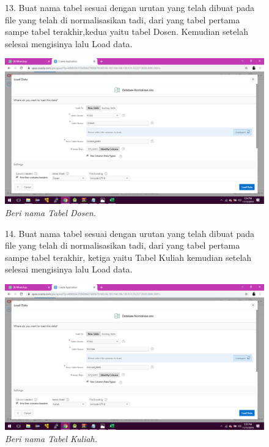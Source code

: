 \begin{enumerate}
\begin{figure}
\item[13.]Buat nama tabel sesuai dengan urutan yang telah dibuat pada file yang telah di normalisasikan tadi, dari yang tabel pertama sampe tabel terakhir,kedua yaitu tabel Dosen. Kemudian setelah selesai mengisinya lalu Load data.
    \begin{center}
    \includegraphics[scale=0.3]{figures/10.png}
    \caption{\textit{Beri nama Tabel Dosen.}}
    \end{center}
    \label{gambar}
    \end{figure}

\begin{figure}
\item[14.]Buat nama tabel sesuai dengan urutan yang telah dibuat pada file yang telah di normalisasikan tadi, dari yang tabel pertama sampe tabel terakhir, ketiga yaitu Tabel Kuliah kemudian setelah selesai mengisinya lalu Load data.
    \begin{center}
    \includegraphics[scale=0.3]{figures/13.png}
    \caption{\textit{Beri nama Tabel Kuliah.}}
    \end{center}
    \label{gambar}
    \end{figure}


\end{enumerate}
